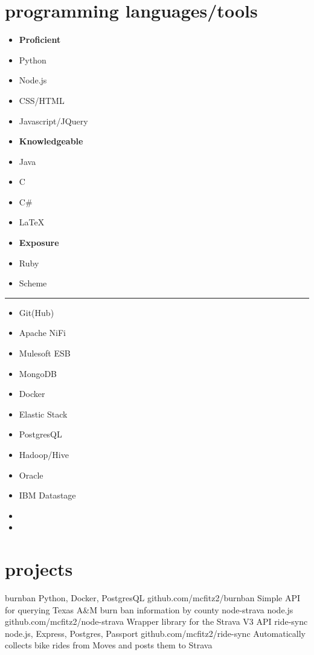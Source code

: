 \documentclass[]{friggeri-cv} %
\begin{document}
\section{programming languages/tools}
\vspace{-0.3cm}
\begin{multicols}{3}
 \begin{itemize}[noitemsep,nolistsep]
     \item[] \textbf{Proficient}
     \item[] Python
     \item[] Node.js
     \item[] CSS/HTML
     \item[] Javascript/JQuery
     \item[] \textbf{Knowledgeable }
     \item[] Java
     \item[] C
     \item[] C\#
     \item[] \LaTeX
     \item[] \textbf{Exposure}
     \item[] Ruby
     \item[] Scheme
 \end{itemize}
\end{multicols}
\vspace{-0.5cm}
\textcolor{lightgray}{\rule{15cm}{0.3pt}}
\begin{multicols}{3}
 \begin{itemize}[noitemsep,nolistsep]
     \item[] Git(Hub)
   	 \item[] Apache NiFi
   	 \item[] Mulesoft ESB
     \item[] MongoDB
     \item[] Docker
     \item[] Elastic Stack
     \item[] PostgresQL 
     \item[] Hadoop/Hive
     \item[] Oracle
     \item[] IBM Datastage
     \item[] 
     \item[] 
 \end{itemize}
\end{multicols}
\section{projects}
\vspace{-0.2cm}
 \begin{entrylist}
 \entry
     {burnban}
     {Python, Docker, PostgresQL}
     {github.com/mcfitz2/burnban}
     {Simple API for querying Texas A&M burn ban information by county}
     {}
 \entry
     {node-strava}
     {node.js}
     {github.com/mcfitz2/node-strava}
     {Wrapper library for the Strava V3 API}
     {}
    \entry
     {ride-sync}
     {node.js, Express, Postgres, Passport}
     {github.com/mcfitz2/ride-sync}
     {Automatically collects bike rides from Moves and posts them to Strava}
     {}
 \end{entrylist}
\end{document}

